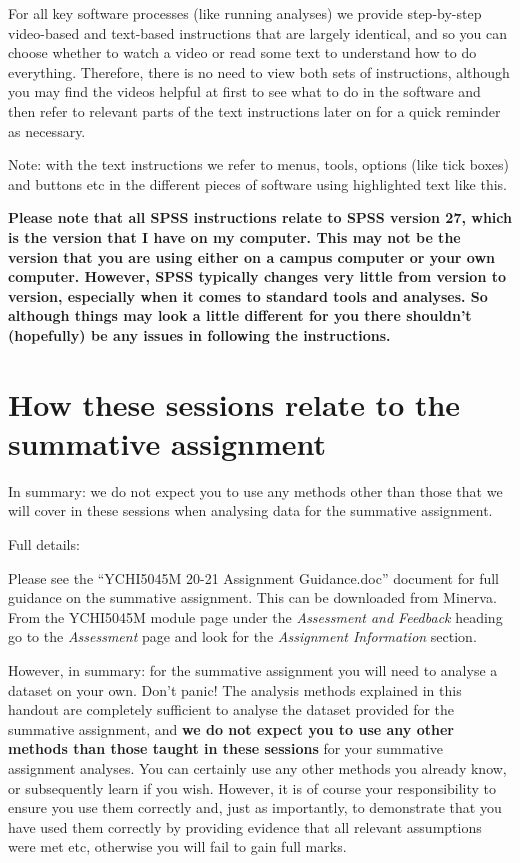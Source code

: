 \documentclass[
]{book}
\begin{document}
For all key software processes (like running analyses) we provide step-by-step video-based and text-based instructions that are largely identical, and so you can choose whether to watch a video or read some text to understand how to do everything. Therefore, there is no need to view both sets of instructions, although you may find the videos helpful at first to see what to do in the software and then refer to relevant parts of the text instructions later on for a quick reminder as necessary.

Note: with the text instructions we refer to menus, tools, options (like tick boxes) and buttons etc in the different pieces of software using highlighted text like this.

\textbf{Please note that all SPSS instructions relate to SPSS version 27, which is the version that I have on my computer. This may not be the version that you are using either on a campus computer or your own computer. However, SPSS typically changes very little from version to version, especially when it comes to standard tools and analyses. So although things may look a little different for you there shouldn't (hopefully) be any issues in following the instructions.}

\hypertarget{how-these-sessions-relate-to-the-summative-assignment}{%
\section{How these sessions relate to the summative assignment}\label{how-these-sessions-relate-to-the-summative-assignment}}

In summary: we do not expect you to use any methods other than those that we will cover in these sessions when analysing data for the summative assignment.

Full details:

Please see the ``YCHI5045M 20-21 Assignment Guidance.doc'' document for full guidance on the summative assignment. This can be downloaded from Minerva. From the YCHI5045M module page under the \emph{Assessment and Feedback} heading go to the \emph{Assessment} page and look for the \emph{Assignment Information} section.

However, in summary: for the summative assignment you will need to analyse a dataset on your own. Don't panic! The analysis methods explained in this handout are completely sufficient to analyse the dataset provided for the summative assignment, and \textbf{we do not expect you to use any other methods than those taught in these sessions} for your summative assignment analyses. You can certainly use any other methods you already know, or subsequently learn if you wish. However, it is of course your responsibility to ensure you use them correctly and, just as importantly, to demonstrate that you have used them correctly by providing evidence that all relevant assumptions were met etc, otherwise you will fail to gain full marks.
\end{document}
